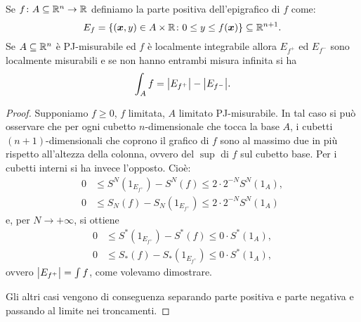 \begin{theorem}
Se $f\colon A\subseteq {\mathbb R}^n \to {\mathbb R}$ definiamo la parte positiva dell'epigrafico di $f$
come:
\[
  E_f = {\left\{ (\boldsymbol x,y)\in A\times {\mathbb R} \colon 0 \le y \le f(\boldsymbol x) \right\}} \subseteq {\mathbb R}^{n+1}.
\]
Se $A\subseteq {\mathbb R}^n$ è PJ-misurabile ed $f$ è localmente integrabile 
allora $E_{f^+}$ ed $E_{f^-}$ sono localmente misurabili e se non
hanno entrambi misura infinita si ha 
\[
  \int_A f = {\left|E_{f^+}\right|} - {\left|E_{f^-}\right|}.
\]
\end{theorem}

\begin{proof}
Supponiamo $f\ge 0$, $f$ limitata, $A$ limitato PJ-misurabile.
In tal caso si può osservare che 
per ogni cubetto $n$-dimensionale che tocca la base $A$, 
i cubetti $(n+1)$-dimensionali che coprono il grafico di $f$ 
sono al massimo due in più rispetto all'altezza della colonna, 
ovvero del $\sup$ di $f$ 
sul cubetto base. Per i cubetti interni si ha invece l'opposto. Cioè:
\begin{align*}
    0 & \le S^N(1_{E_{f^+}}) - S^N(f) \le 2\cdot 2^{-N} S^N(1_A),\\
    0 & \le S_N(f) - S_N(1_{E_{f^+}}) \le 2\cdot 2^{-N} S^N(1_A)
\end{align*}
e, per $N\to +\infty$, si ottiene 
\begin{align*}
  0 &\le S^*(1_{E_{f^+}}) - S^*(f) \le 0\cdot S^*(1_A), \\
  0 &\le S_*(f) - S_*(1_{E_{f^+}}) \le 0\cdot S^*(1_A), 
\end{align*}
ovvero ${\left|E_{f^+}\right|}=\int f$, come volevamo dimostrare.

Gli altri casi vengono di conseguenza separando parte positiva e parte negativa 
e passando al limite nei troncamenti.
\end{proof}

